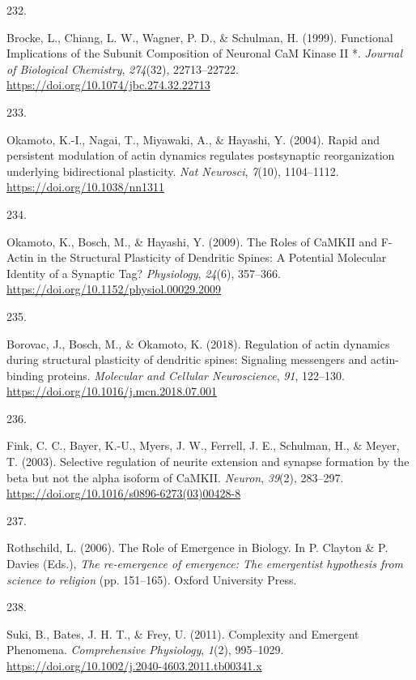 \documentclass[
  11pt,
  letterpaper,
]{scrreprt}
\newlength{\cslhangindent}
\newlength{\csllabelwidth}
\newenvironment{CSLReferences}[2] %
 {\begin{list}{}{%
  \setlength{\itemindent}{0pt}
  \setlength{\leftmargin}{0pt}
  \setlength{\parsep}{0pt}
  \ifodd #1
   \setlength{\leftmargin}{\cslhangindent}
   \setlength{\itemindent}{-1\cslhangindent}
  \fi
  \setlength{\itemsep}{#2\baselineskip}}}
 {\end{list}}
\newcommand{\CSLLeftMargin}[1]{\parbox[t]{\csllabelwidth}{\strut#1\strut}}
\newcommand{\CSLRightInline}[1]{\parbox[t]{\linewidth - \csllabelwidth}{\strut#1\strut}}
\begin{document}
\begin{CSLReferences}{0}{0}
\CSLLeftMargin{232. }%
\CSLRightInline{Brocke, L., Chiang, L. W., Wagner, P. D., \& Schulman,
H. (1999). Functional {Implications} of the {Subunit Composition} of
{Neuronal CaM Kinase II} *. \emph{Journal of Biological Chemistry},
\emph{274}(32), 22713--22722.
\url{https://doi.org/10.1074/jbc.274.32.22713}}

\CSLLeftMargin{233. }%
\CSLRightInline{Okamoto, K.-I., Nagai, T., Miyawaki, A., \& Hayashi, Y.
(2004). Rapid and persistent modulation of actin dynamics regulates
postsynaptic reorganization underlying bidirectional plasticity.
\emph{Nat Neurosci}, \emph{7}(10), 1104--1112.
\url{https://doi.org/10.1038/nn1311}}

\CSLLeftMargin{234. }%
\CSLRightInline{Okamoto, K., Bosch, M., \& Hayashi, Y. (2009). The
{Roles} of {CaMKII} and {F-Actin} in the {Structural Plasticity} of
{Dendritic Spines}: {A Potential Molecular Identity} of a {Synaptic
Tag}? \emph{Physiology}, \emph{24}(6), 357--366.
\url{https://doi.org/10.1152/physiol.00029.2009}}

\CSLLeftMargin{235. }%
\CSLRightInline{Borovac, J., Bosch, M., \& Okamoto, K. (2018).
Regulation of actin dynamics during structural plasticity of dendritic
spines: {Signaling} messengers and actin-binding proteins.
\emph{Molecular and Cellular Neuroscience}, \emph{91}, 122--130.
\url{https://doi.org/10.1016/j.mcn.2018.07.001}}

\CSLLeftMargin{236. }%
\CSLRightInline{Fink, C. C., Bayer, K.-U., Myers, J. W., Ferrell, J. E.,
Schulman, H., \& Meyer, T. (2003). Selective regulation of neurite
extension and synapse formation by the beta but not the alpha isoform of
{CaMKII}. \emph{Neuron}, \emph{39}(2), 283--297.
\url{https://doi.org/10.1016/s0896-6273(03)00428-8}}

\CSLLeftMargin{237. }%
\CSLRightInline{Rothschild, L. (2006). The {Role} of {Emergence} in
{Biology}. In P. Clayton \& P. Davies (Eds.), \emph{The re-emergence of
emergence: The emergentist hypothesis from science to religion} (pp.
151--165). Oxford University Press.}

\CSLLeftMargin{238. }%
\CSLRightInline{Suki, B., Bates, J. H. T., \& Frey, U. (2011).
Complexity and {Emergent Phenomena}. \emph{Comprehensive Physiology},
\emph{1}(2), 995--1029.
\url{https://doi.org/10.1002/j.2040-4603.2011.tb00341.x}}


\end{CSLReferences}
\end{document}
